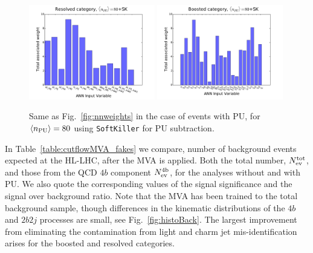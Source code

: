 \begin{figure}[t]
\begin{center}
\includegraphics[width=0.49\textwidth]{plots/res_wgthist_SKPU80.pdf}
\includegraphics[width=0.49\textwidth]{plots/bst_wgthist_SKPU80.pdf}
\vspace{-0.5cm}
\caption{\small
Same as Fig.~\ref{fig:nnweights} in the
case of events with PU, for
$\left\langle n_{\rm PU}\right\rangle=80$
using
{\tt SoftKiller} for PU subtraction.
}
\label{fig:nnweights_PU}
\end{center}
\end{figure}


In Table~\ref{table:cutflowMVA_fakes} we compare,
number of background events  expected at the HL-LHC, after the MVA is applied.
Both the total number, $N_{\rm ev}^{\rm tot}$,
and those from the  QCD $4b$ component
$N_{\rm ev}^{\rm 4b}$, for the analyses without and
with PU.
%
 We also quote the corresponding values of the signal 
    significance and the signal over background ratio.
    Note that the MVA has been trained to the total background sample,
    though differences
    in the kinematic distributions of the $4b$ and $2b2j$ processes are small,
    see Fig.~\ref{fig:histoBack}.
    The largest improvement from eliminating the contamination
    from light and charm jet mis-identification arises
    for the boosted and resolved categories.
%

